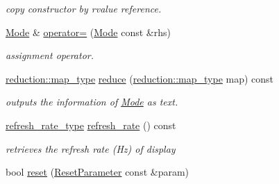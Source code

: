 \begin{DoxyCompactItemize}
\begin{DoxyCompactList}\small\item\em copy constructor by rvalue reference. \end{DoxyCompactList}\item 
\hypertarget{classhryky_1_1display_1_1_mode_a427b74e20d3cf666b4b83cbfde3ad390}{\hyperlink{classhryky_1_1display_1_1_mode}{Mode} \& \hyperlink{classhryky_1_1display_1_1_mode_a427b74e20d3cf666b4b83cbfde3ad390}{operator=} (\hyperlink{classhryky_1_1display_1_1_mode}{Mode} const \&rhs)}\label{classhryky_1_1display_1_1_mode_a427b74e20d3cf666b4b83cbfde3ad390}

\begin{DoxyCompactList}\small\item\em assignment operator. \end{DoxyCompactList}\item 
\hypertarget{classhryky_1_1display_1_1_mode_a9f90ae973ea63461f679c8bf374800f2}{\hyperlink{namespacehryky_1_1reduction_a64228de3f2cff9ed9d5ad836a120c7f7}{reduction\-::map\-\_\-type} \hyperlink{classhryky_1_1display_1_1_mode_a9f90ae973ea63461f679c8bf374800f2}{reduce} (\hyperlink{namespacehryky_1_1reduction_a64228de3f2cff9ed9d5ad836a120c7f7}{reduction\-::map\-\_\-type} map) const }\label{classhryky_1_1display_1_1_mode_a9f90ae973ea63461f679c8bf374800f2}

\begin{DoxyCompactList}\small\item\em outputs the information of \hyperlink{classhryky_1_1display_1_1_mode}{Mode} as text. \end{DoxyCompactList}\item 
\hypertarget{classhryky_1_1display_1_1_mode_a630c4afc7a681e0b50b278987a8f80b4}{\hyperlink{namespacehryky_1_1display_ac8bdbe1db3aaf491d26848562e9fa29c}{refresh\-\_\-rate\-\_\-type} \hyperlink{classhryky_1_1display_1_1_mode_a630c4afc7a681e0b50b278987a8f80b4}{refresh\-\_\-rate} () const }\label{classhryky_1_1display_1_1_mode_a630c4afc7a681e0b50b278987a8f80b4}

\begin{DoxyCompactList}\small\item\em retrieves the refresh rate (Hz) of display \end{DoxyCompactList}\item 
\hypertarget{classhryky_1_1display_1_1_mode_a6826c1efd764c64520bf954f480444d4}{bool \hyperlink{classhryky_1_1display_1_1_mode_a6826c1efd764c64520bf954f480444d4}{reset} (\hyperlink{structhryky_1_1display_1_1_mode_1_1_reset_parameter}{Reset\-Parameter} const \&param)}\label{classhryky_1_1display_1_1_mode_a6826c1efd764c64520bf954f480444d4}


\end{DoxyCompactItemize}
